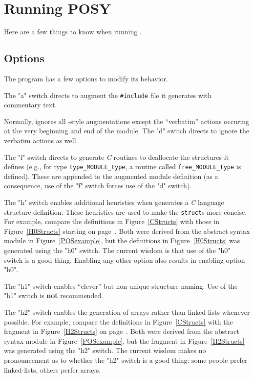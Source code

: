 \section	{Running POSY}
Here are a few things to know when running .

\subsection	{Options}\label{posy:options}
The  program has a few options to modify its behavior.

The \switch"a" switch directs  to augment the \verb"#include" file
it generates with commentary text.

Normally,  ignores all -style augmentations except the
``verbatim'' actions occuring at the very beginning and end of the module.
The \switch"d" switch directs  to ignore the verbatim actions as
well.

The \switch"f" switch directs   to generate {\em C\/} routines to
deallocate the structures it defines
(e.g., for type \verb"type_MODULE_type",
a routine called \verb"free_MODULE_type" is defined).
These are appended to the augmented module definition
(as a consequence,
use of the \switch"f" switch forces use of the \switch"d" switch).

The \switch"h" switch enables additional heuristics when  generates
a {\em C\/} language structure definition.
These heuristics are used to make the \verb"struct"s more concise.
For example,
compare the definitions in Figure~\ref{CStructs} with those in
Figure~\ref{H0Structs} starting on page~\pageref{H0Structs}.
Both were derived from the abstract syntax module in Figure~\ref{POSexample},
but the definitions in Figure~\ref{H0Structs} was generated using the
\switch"h0" switch.
The current wisdom is that use of the \switch"h0" switch is a good thing.
Enabling any other option also results in enabling option \switch"h0".

The \switch"h1" switch
enables ``clever'' but non-unique structure naming.
Use of the \switch"h1" switch is {\bf not\/} recommended.

The \switch"h2" switch enables the generation of arrays rather than
linked-lists whenever possible.
For example,
compare the definitions in Figure~\ref{CStructs} with the fragment in
Figure~\ref{H2Structs} on page~\pageref{H2Structs}.
Both were derived from the abstract syntax module in Figure~\ref{POSexample},
but the fragment in Figure~\ref{H2Structs} was generated using the
\switch"h2" switch.
The current wisdom makes no pronouncement as to whether the \switch"h2" switch
is a good thing: some people prefer linked-lists, others perfer arrays.

